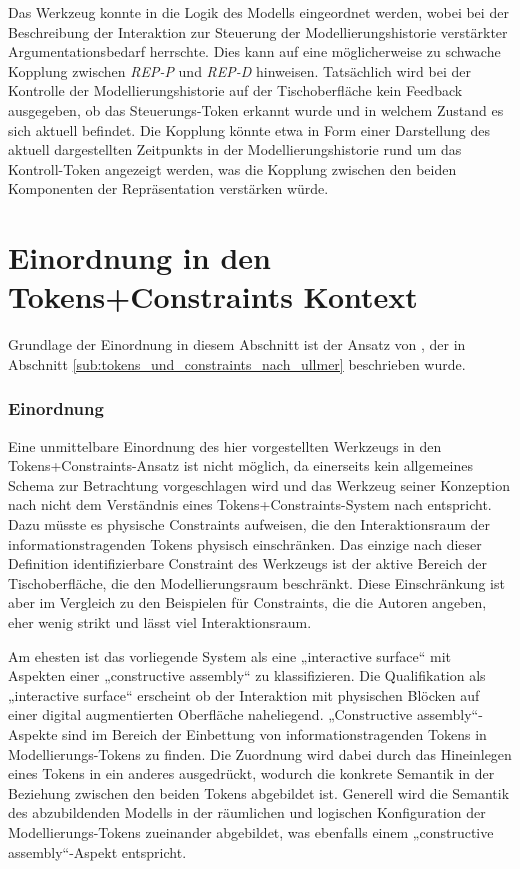 Das Werkzeug konnte in die Logik des Modells eingeordnet werden, wobei bei der Beschreibung der Interaktion zur Steuerung der Modellierungshistorie verstärkter Argumentationsbedarf herrschte. Dies kann auf eine möglicherweise zu schwache Kopplung zwischen \emph{REP-P} und \emph{REP-D} hinweisen. Tatsächlich wird bei der Kontrolle der Modellierungshistorie auf der Tischoberfläche kein Feedback ausgegeben, ob das Steuerungs-Token erkannt wurde und in welchem Zustand es sich aktuell befindet. Die Kopplung könnte etwa in Form einer Darstellung des aktuell dargestellten Zeitpunkts in der Modellierungshistorie rund um das Kontroll-Token angezeigt werden, was die Kopplung zwischen den beiden Komponenten der Repräsentation verstärken würde.


\section{Einordnung in den Tokens+Constraints Kontext} %
\label{sec:einordnung_in_den_tokens_constraints_kontext}

Grundlage der Einordnung in diesem Abschnitt ist der Ansatz von \citet{Ullmer05}, der in Abschnitt \ref{sub:tokens_und_constraints_nach_ullmer} beschrieben wurde.

\subsubsection{Einordnung}

Eine unmittelbare Einordnung des hier vorgestellten Werkzeugs in den Tokens+Constraints-Ansatz ist nicht möglich, da einerseits kein allgemeines Schema zur Betrachtung vorgeschlagen wird und das Werkzeug seiner Konzeption nach nicht dem Verständnis eines Tokens+Constraints-System nach \citet{Ullmer05} entspricht. Dazu müsste es physische Constraints aufweisen, die den Interaktionsraum der informationstragenden Tokens physisch einschränken. Das einzige nach dieser Definition identifizierbare Constraint des Werkzeugs ist der aktive Bereich der Tischoberfläche, die den Modellierungsraum beschränkt. Diese Einschränkung ist aber im Vergleich zu den Beispielen für Constraints, die die Autoren angeben, eher wenig strikt und lässt viel Interaktionsraum.

Am ehesten ist das vorliegende System als eine „interactive surface“ mit Aspekten einer „constructive assembly“ zu klassifizieren. Die Qualifikation als „interactive surface“ erscheint ob der Interaktion mit physischen Blöcken auf einer digital augmentierten Oberfläche naheliegend. „Constructive assembly“-Aspekte sind im Bereich der Einbettung von informationstragenden Tokens in Modellierungs-Tokens zu finden. Die Zuordnung wird dabei durch das Hineinlegen eines Tokens in ein anderes ausgedrückt, wodurch die konkrete Semantik in der Beziehung zwischen den beiden Tokens abgebildet ist. Generell wird die Semantik des abzubildenden Modells in der räumlichen und logischen Konfiguration der Modellierungs-Tokens zueinander abgebildet, was ebenfalls einem „constructive assembly“-Aspekt entspricht.

